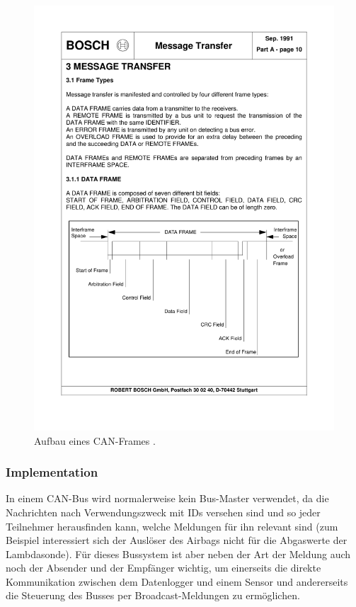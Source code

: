 \begin{figure}
	\centering
		\includegraphics[height=0.9\textheight]{images/canframe.pdf}
	\caption{Aufbau eines CAN-Frames \cite{can_arbit}.}
	\label{fig.canframe}
\end{figure}

\subsubsection{Implementation}
In einem CAN-Bus wird normalerweise kein Bus-Master verwendet, da die Nachrichten nach Verwendungszweck mit IDs versehen sind und so jeder Teilnehmer herausfinden kann, welche Meldungen für ihn relevant sind (zum Beispiel interessiert sich der Auslöser des Airbags nicht für die Abgaswerte der Lambdasonde). Für dieses Bussystem ist aber neben der Art der Meldung auch noch der Absender und der Empfänger wichtig, um einerseits die direkte Kommunikation zwischen dem Datenlogger und einem Sensor und andererseits die Steuerung des Busses per Broadcast-Meldungen zu ermöglichen.



